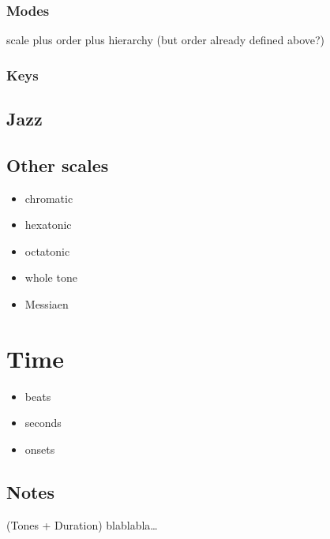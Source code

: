\documentclass[letterpaper,10pt,english]{sphinxmanual}
\begin{document}
\subsubsection{Modes}
\label{\detokenize{1_fundamentals:modes}}
scale plus order plus hierarchy (but order already defined above?)


\subsubsection{Keys}
\label{\detokenize{1_fundamentals:keys}}

\subsection{Jazz}
\label{\detokenize{1_fundamentals:jazz}}

\subsection{Other scales}
\label{\detokenize{1_fundamentals:other-scales}}\begin{itemize}
\item {} 
chromatic

\item {} 
hexatonic

\item {} 
octatonic

\item {} 
whole tone

\item {} 
Messiaen

\end{itemize}


\section{Time}
\label{\detokenize{1_fundamentals:time}}\begin{itemize}
\item {} 
beats

\item {} 
seconds

\item {} 
onsets

\end{itemize}


\subsection{Notes}
\label{\detokenize{1_fundamentals:notes}}
(Tones + Duration)
blablabla…
\end{document}

